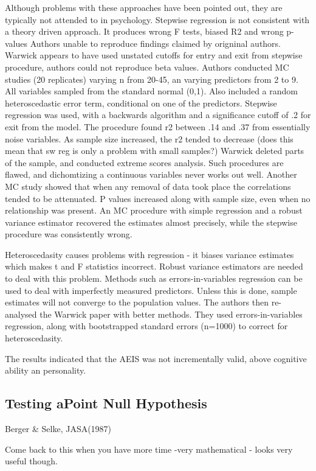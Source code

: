 Although problems with these approaches have been pointed out, they are typically not attended to in psychology.
Stepwise regression is not consistent with a theory driven approach.
It produces wrong F tests, biased R2 and wrong p-values
Authors unable to reproduce findings claimed by origninal authors.
Warwick appears to have used unstated cutoffs for entry and exit from stepwise procedure, authors could not reproduce beta values.
Authors conducted MC studies (20 replicates) varying n from 20-45, an varying predictors from 2 to 9.
All variables sampled from the standard normal (0,1).
Also included a random heteroscedastic error term, conditional on one of the predictors.
Stepwise regression was used, with a backwards algorithm and a significance cutoff of .2 for exit from the model. 
The procedure found r2 between .14 and .37 from essentially noise variables.
As sample size increased, the r2 tended to decrease (does this mean that sw reg is only a problem with small samples?)
Warwick deleted parts of the sample, and conducted extreme scores analysis. Such procedures are flawed, and dichomtizing a continuous variables never works out well.
Another MC study showed that when any removal of data took place the correlations tended to be attenuated. 
P values increased along with sample size, even when no relationship was present.
An MC procedure with simple regression and a robust variance estimator recovered the estimates almost precisely, while the stepwise procedure was consistently wrong. 

Heteroscedasity causes problems with regression - it biases variance estimates which makes t and F statistics incorrect. Robust variance estimators are needed to deal with this problem. 
Methods such as errors-in-variables regression can be used to deal with imperfectly measured predictors. Unless this is done, sample estimates will not converge to the population values.
The authors then re-analysed the Warwick paper with better methods. 
They used errors-in-variables regression, along with bootstrapped standard errors (n=1000) to correct for heteroscedasity.

The results indicated that the AEIS was not incrementally valid, above cognitive ability an personality. 

\subsection{Testing aPoint Null Hypothesis}
Berger \& Selke, JASA(1987)

Come back to this when you have more time -very mathematical - looks very useful though.


